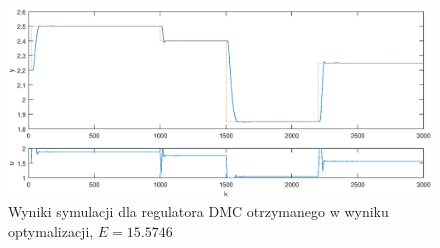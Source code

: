 \begin{figure}[ht]
\centering
\includegraphics[scale=1]{images/Z6optimizedDMC}
\caption{Wyniki symulacji dla regulatora DMC otrzymanego w wyniku optymalizacji, $E=\num{15,5746}$}
\label{Z6optimizedDMC}
\end{figure}
